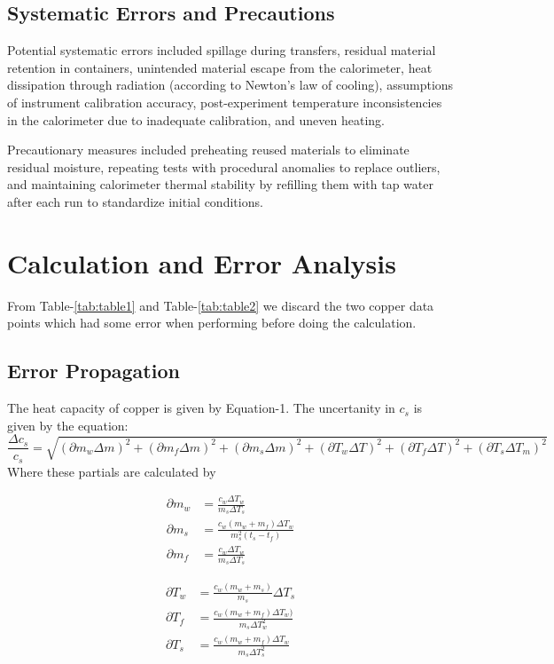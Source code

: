 \documentclass[%
 sor,
 jor,
 amsmath,amssymb,
 reprint,%
]{revtex4-2}
\begin{document}
\subsection{Systematic Errors and Precautions}  
Potential systematic errors included spillage during transfers, residual material retention in containers, unintended material escape from the calorimeter, heat dissipation through radiation (according to Newton's law of cooling), assumptions of instrument calibration accuracy, post-experiment temperature inconsistencies in the calorimeter due to inadequate calibration, and uneven heating.  

Precautionary measures included preheating reused materials to eliminate residual moisture, repeating tests with procedural anomalies to replace outliers, and maintaining calorimeter thermal stability by refilling them with tap water after each run to standardize initial conditions.


\section{Calculation and Error Analysis}
From Table-\ref{tab:table1} and Table-{\ref{tab:table2}} we discard the two copper data points which had some error when performing before doing the calculation. 
\subsection{Error Propagation}

The heat capacity of copper is given by Equation-1. The uncertanity in $c_s$ is given by the equation:
$$
   \frac {\Delta c_s} {c_s} =\sqrt{ 
(\partial m_w \Delta m)^2 + (\partial m_f \Delta m)^2 + (\partial m_s \Delta m)^2 + (\partial T_w \Delta T)^2 + (\partial T_f \Delta T)^2 + (\partial T_s \Delta T_m)^2 
}$$
Where these partials are calculated by\\
\begin{minipage}{0.5\textwidth}
\begin{align*}
  {\partial m_w} &= \frac{c_w \Delta T_w}{m_s \Delta T_s} \\
  {\partial m_s} &= \frac{c_w(m_w +m_f)\Delta T_w}{m_s^2 (t_s - t_f)} \\
    {\partial m_f} &= \frac{c_w \Delta T_w}{m_s \Delta T_s}
\end{align*}
\end{minipage}%
\begin{minipage}{0.5\textwidth}
\begin{align*}
{\partial T_w} &= \frac{c_w(m_w + m_s) }{m_s} {\Delta T_s} \\
   {\partial T_f} &= \frac{c_w(m_w + m_f) \Delta T_w)}{m_s \Delta T_w^2} \\
    {\partial T_s} &= \frac{c_w(m_w +m_f)\Delta T_w}{m_s \Delta T_s^2}
\end{align*}
\end{minipage}
\end{document}
